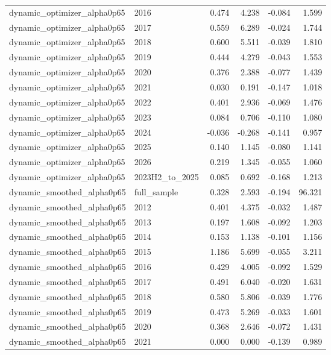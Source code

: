 \begin{longtable}{llrrrr}
dynamic\_optimizer\_alpha0p65 & 2016 & 0.474 & 4.238 & -0.084 & 1.599 \\
dynamic\_optimizer\_alpha0p65 & 2017 & 0.559 & 6.289 & -0.024 & 1.744 \\
dynamic\_optimizer\_alpha0p65 & 2018 & 0.600 & 5.511 & -0.039 & 1.810 \\
dynamic\_optimizer\_alpha0p65 & 2019 & 0.444 & 4.279 & -0.043 & 1.553 \\
dynamic\_optimizer\_alpha0p65 & 2020 & 0.376 & 2.388 & -0.077 & 1.439 \\
dynamic\_optimizer\_alpha0p65 & 2021 & 0.030 & 0.191 & -0.147 & 1.018 \\
dynamic\_optimizer\_alpha0p65 & 2022 & 0.401 & 2.936 & -0.069 & 1.476 \\
dynamic\_optimizer\_alpha0p65 & 2023 & 0.084 & 0.706 & -0.110 & 1.080 \\
dynamic\_optimizer\_alpha0p65 & 2024 & -0.036 & -0.268 & -0.141 & 0.957 \\
dynamic\_optimizer\_alpha0p65 & 2025 & 0.140 & 1.145 & -0.080 & 1.141 \\
dynamic\_optimizer\_alpha0p65 & 2026 & 0.219 & 1.345 & -0.055 & 1.060 \\
dynamic\_optimizer\_alpha0p65 & 2023H2\_to\_2025 & 0.085 & 0.692 & -0.168 & 1.213 \\
dynamic\_smoothed\_alpha0p65 & full\_sample & 0.328 & 2.593 & -0.194 & 96.321 \\
dynamic\_smoothed\_alpha0p65 & 2012 & 0.401 & 4.375 & -0.032 & 1.487 \\
dynamic\_smoothed\_alpha0p65 & 2013 & 0.197 & 1.608 & -0.092 & 1.203 \\
dynamic\_smoothed\_alpha0p65 & 2014 & 0.153 & 1.138 & -0.101 & 1.156 \\
dynamic\_smoothed\_alpha0p65 & 2015 & 1.186 & 5.699 & -0.055 & 3.211 \\
dynamic\_smoothed\_alpha0p65 & 2016 & 0.429 & 4.005 & -0.092 & 1.529 \\
dynamic\_smoothed\_alpha0p65 & 2017 & 0.491 & 6.040 & -0.020 & 1.631 \\
dynamic\_smoothed\_alpha0p65 & 2018 & 0.580 & 5.806 & -0.039 & 1.776 \\
dynamic\_smoothed\_alpha0p65 & 2019 & 0.473 & 5.269 & -0.033 & 1.601 \\
dynamic\_smoothed\_alpha0p65 & 2020 & 0.368 & 2.646 & -0.072 & 1.431 \\
dynamic\_smoothed\_alpha0p65 & 2021 & 0.000 & 0.000 & -0.139 & 0.989 \\

\end{longtable}
